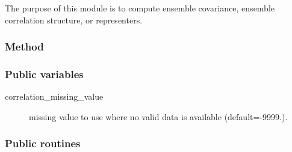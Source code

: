 \documentclass[11pt]{article}
\begin{document}
The purpose of this module is to compute
ensemble covariance, ensemble correlation structure, or representers.

\subsubsection*{Method}

\subsubsection*{Public variables}

\begin{description}
\item[correlation\_missing\_value] missing value to use where no valid data is available (default=-9999.).
\end{description}

\subsubsection*{Public routines}
\end{document}

